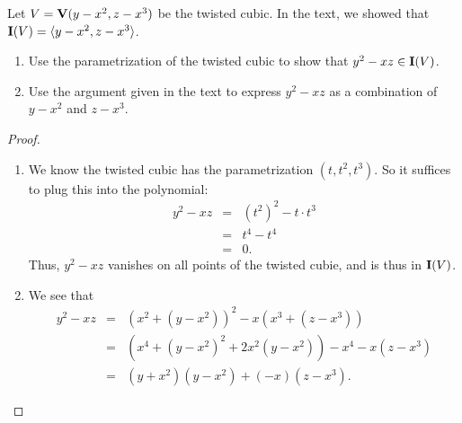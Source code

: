 \begin{exercise}{9}
Let $V = \mathbf{V}(y-x^2, z-x^3)$ be the twisted cubic. 
In the text, we showed that $\mathbf{I}(V) = \langle y-x^2, z-x^3\rangle$.
\begin{enumerate}
    \item Use the parametrization of the twisted cubic to show that $y^2 - xz\in \mathbf{I}(V)$.
    \item Use the argument given in the text to express $y^2 - xz$ as a combination of $y-x^2$ and $z-x^3$.
\end{enumerate}
\end{exercise}
\begin{proof}
    \begin{enumerate}
        \item We know the twisted cubic has the parametrization $(t,t^2,t^3)$. 
        So it suffices to plug this into the polynomial:
        \begin{eqnarray*}
            y^2 - xz
            & = & (t^2)^2 - t\cdot t^3\\
            & = & t^4 - t^4\\
            & = & 0.
        \end{eqnarray*}
        Thus, $y^2 - xz$ vanishes on all points of the twisted cubie, and is thus in $\mathbf{I}(V)$.
        \item We see that
        \begin{eqnarray*}
            y^2 - xz
            & = & (x^2 + (y-x^2))^2 - x(x^3 + (z-x^3))\\
            & = & (x^4 + (y-x^2)^2 + 2x^2(y-x^2) ) - x^4 - x(z-x^3)\\
            & = & (y+x^2)(y-x^2) + (-x)(z-x^3).
        \end{eqnarray*}
    \end{enumerate}
\end{proof}


